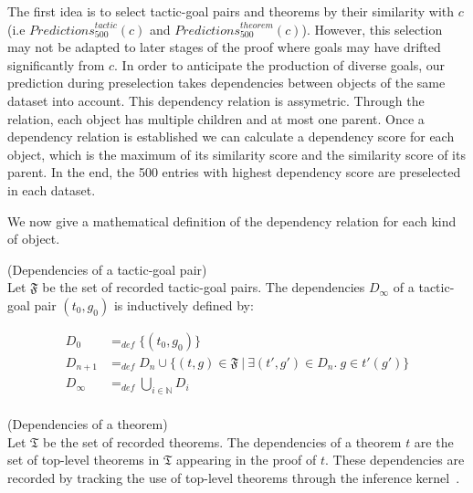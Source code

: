 \documentclass[runningheads,a4paper,draft]{svjour3}
\begin{document}

The first idea is to select tactic-goal pairs and theorems by their similarity 
with $c$ (i.e $\mathit{Predictions}^{\mathit{tactic}}_{500} (c)$ and
$\mathit{Predictions}^{\mathit{theorem}}_{500} (c)$).
However, this selection may not be adapted to later stages of
the proof where goals may have drifted significantly from $c$. In order to
anticipate the production of diverse goals, our prediction during preselection
takes dependencies between objects of the same dataset into account.
This dependency relation is assymetric. Through the relation, each object has
multiple children and at most one parent.
Once a dependency relation is established we can calculate a dependency score
for each object, which is the maximum of its similarity score 
and the similarity score of its parent. In the end, the 500 entries with 
highest dependency score are preselected in each dataset.

We now give a mathematical definition of the dependency relation for each kind 
of object.

\begin{definition}(Dependencies of a tactic-goal pair)\\
Let $\mathfrak{F}$ be the set of recorded tactic-goal pairs.
The dependencies $D_\infty$ of a tactic-goal pair $(t_0,g_0)$ is
inductively defined by:

\begin{align*}
D_0 &=_{def} \lbrace (t_0,g_0) \rbrace \\
D_{n+1} &=_{def} D_n \cup \lbrace (t,g)\in \mathfrak{F}\  |\ \exists
(t',g') \in D_n.\ g \in t'(g') \rbrace  \\
D_\infty &=_{def} \bigcup_{i \in \mathbb{N}} D_i\\
\end{align*}
\end{definition}


\begin{definition}(Dependencies of a theorem)\\
Let $\mathfrak{T}$ be the set of recorded theorems.
The dependencies of a theorem $t$ are the set of top-level theorems in
$\mathfrak{T}$ appearing in the proof of $t$. These dependencies are
recorded by tracking the use of top-level theorems through the inference 
kernel~\cite{tgck-cpp15}.
\end{definition}
\end{document}
